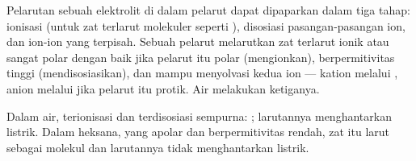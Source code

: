 \begin{proposition}\label{prop:b1:intermolecular-forces-solvents:steps}
Pelarutan sebuah elektrolit di dalam pelarut dapat dipaparkan dalam tiga
tahap: ionisasi (untuk zat terlarut molekuler seperti ),
disosiasi pasangan-pasangan ion, dan  ion-ion yang terpisah.
Sebuah pelarut melarutkan zat terlarut ionik atau sangat polar dengan
baik jika pelarut itu polar (mengionkan), berpermitivitas tinggi
(mendisosiasikan), dan mampu menyolvasi kedua ion --- kation melalui
, anion melalui  jika pelarut
itu protik. Air melakukan ketiganya.
\end{proposition}

\begin{example}\label{ex:b1:intermolecular-forces-solvents:hcl}
Dalam air,  terionisasi dan terdisosiasi sempurna:
; larutannya menghantarkan
listrik. Dalam heksana, yang apolar dan berpermitivitas rendah, zat itu
larut sebagai molekul  dan larutannya tidak menghantarkan
listrik.
\end{example}

